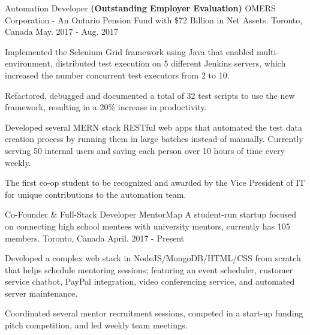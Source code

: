 

\begin{cventries}

  \cventry
    {Automation Developer \tiny\textbf{(Outstanding Employer Evaluation)}} %
    {OMERS Corporation \tiny - An Ontario Pension Fund with \$72 Billion in Net Assets.} %
    {Toronto, Canada} %
    {May. 2017 - Aug. 2017} %
    {
      \begin{cvitems} %
        \item {Implemented the Selenium Grid framework using Java that enabled multi-environment, distributed test execution on 5 different Jenkins servers, which increased the number concurrent test executors from 2 to 10.}
         \item {Refactored, debugged and documented a total of 32 test scripts to use the new framework, resulting in a 20\% increase in productivity.}
        \item {Developed several MERN stack RESTful web apps that automated the test data creation process by running them in large batches instead of manually. Currently serving 50 internal users and saving each person over 10 hours of time every weekly.}
        \item {The first co-op student to be recognized and awarded by the Vice President of IT for unique contributions to the automation team.}
      \end{cvitems}
    }

  \cventry
    {Co-Founder \& Full-Stack Developer} %
    {MentorMap 
    \href{https://www.mentormap.ca}{\faLink\acvHeaderIconSep}
      \tiny A student-run startup focused on connecting high school mentees with university 			mentors, currently has 105 members.}
    {Toronto, Canada} %
    {April. 2017 - Present} %
    {
      \begin{cvitems} %
        \item {Developed a complex web stack in NodeJS/MongoDB/HTML/CSS from scratch that helps schedule mentoring sessions; featuring an event scheduler, customer service chatbot, PayPal integration, video conferencing service, and automated server maintenance.}
        \item {Coordinated several mentor recruitment sessions, competed in a start-up funding pitch competition, and led weekly team meetings.}
      \end{cvitems}
    }


\end{cventries}
